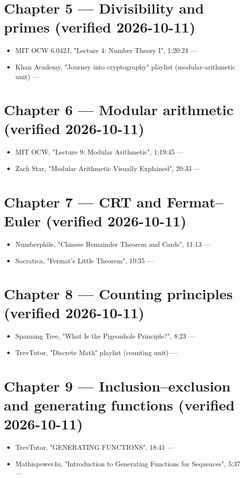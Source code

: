 \section*{Chapter 5 --- Divisibility and primes (verified 2026-10-11)}
\begin{itemize}\setlength\itemsep{2pt}
  \item MIT OCW 6.042J, "Lecture 4: Number Theory I", 1:20:24 ---
  \item Khan Academy, "Journey into cryptography" playlist (modular-arithmetic unit) ---
\end{itemize}

\section*{Chapter 6 --- Modular arithmetic (verified 2026-10-11)}
\begin{itemize}\setlength\itemsep{2pt}
  \item MIT OCW, "Lecture 9: Modular Arithmetic", 1:19:45 ---
  \item Zach Star, "Modular Arithmetic Visually Explained", 20:33 ---
\end{itemize}

\section*{Chapter 7 --- CRT and Fermat--Euler (verified 2026-10-11)}
\begin{itemize}\setlength\itemsep{2pt}
  \item Numberphile, "Chinese Remainder Theorem and Cards", 11:13 ---
  \item Socratica, "Fermat's Little Theorem", 10:35 ---
\end{itemize}

\section*{Chapter 8 --- Counting principles (verified 2026-10-11)}
\begin{itemize}\setlength\itemsep{2pt}
  \item Spanning Tree, "What Is the Pigeonhole Principle?", 8:23 ---
  \item TrevTutor, "Discrete Math" playlist (counting unit) ---
\end{itemize}

\section*{Chapter 9 --- Inclusion--exclusion and generating functions (verified 2026-10-11)}
\begin{itemize}\setlength\itemsep{2pt}
  \item TrevTutor, "GENERATING FUNCTIONS", 18:41 ---
  \item Mathispower4u, "Introduction to Generating Functions for Sequences", 5:37 ---
\end{itemize}

